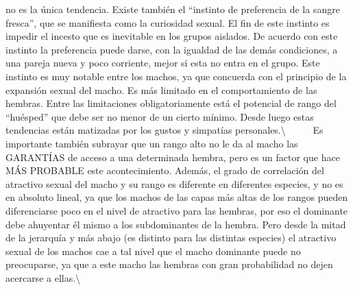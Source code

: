 no es la única tendencia. Existe también el ``instinto de preferencia de
la sangre fresca'', que se manifiesta como la curiosidad sexual. El fin
de este instinto es impedir el incesto que es inevitable en los grupos
aislados. De acuerdo con este instinto la preferencia puede darse, con
la igualdad de las demás condiciones, a una pareja nueva y poco
corriente, mejor si esta no entra en el grupo. Este instinto es muy
notable entre los machos, ya que concuerda con el principio de la
expansión sexual del macho. Es más limitado en el comportamiento de las
hembras. Entre las limitaciones obligatoriamente está el potencial de
rango del ``huésped'' que debe ser no menor de un cierto mínimo. Desde
luego estas tendencias están matizadas por los gustos y simpatías
personales.\textbackslash{} ~ ~ ~ Es importante también subrayar que un
rango alto no le da al macho las GARANTÍAS de acceso a una determinada
hembra, pero es un factor que hace MÁS PROBABLE este acontecimiento.
Además, el grado de correlación del atractivo sexual del macho y su
rango es diferente en diferentes especies, y no es en absoluto lineal,
ya que los machos de las capas más altas de los rangos pueden
diferenciarse poco en el nivel de atractivo para las hembras, por eso el
dominante debe ahuyentar él mismo a los subdominantes de la hembra. Pero
desde la mitad de la jerarquía y más abajo (es distinto para las
distintas especies) el atractivo sexual de los machos cae a tal nivel
que el macho dominante puede no preocuparse, ya que a este macho las
hembras con gran probabilidad no dejen acercarse a
ellas.\textbackslash{}

